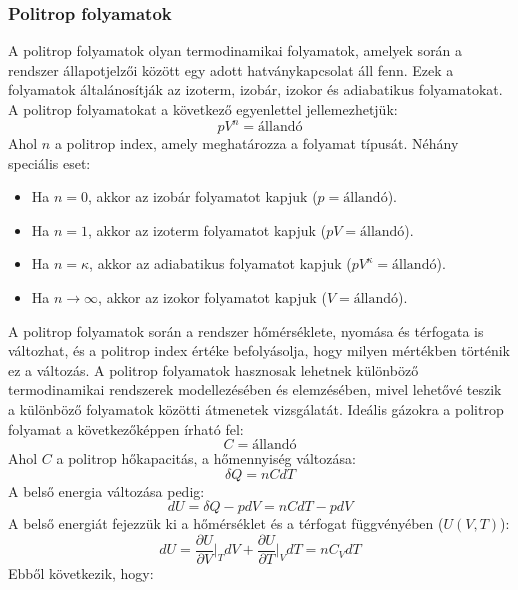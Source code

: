 \documentclass[../main.tex]{subfiles}
\begin{document}
\subsubsection{Politrop folyamatok}
A politrop folyamatok olyan termodinamikai folyamatok, amelyek során a rendszer állapotjelzői között egy adott hatványkapcsolat áll fenn. Ezek a folyamatok általánosítják az izoterm, izobár, izokor és adiabatikus folyamatokat.
A politrop folyamatokat a következő egyenlettel jellemezhetjük:
\begin{equation}
    p V^n = \text{állandó}
\end{equation}
Ahol $n$ a politrop index, amely meghatározza a folyamat típusát. Néhány speciális eset:
\begin{itemize}
    \item Ha $n = 0$, akkor az izobár folyamatot kapjuk ($p = \text{állandó}$).
    \item Ha $n = 1$, akkor az izoterm folyamatot kapjuk ($p V = \text{állandó}$).
    \item Ha $n = \kappa$, akkor az adiabatikus folyamatot kapjuk ($p V^{\kappa} = \text{állandó}$).
    \item Ha $n \to \infty$, akkor az izokor folyamatot kapjuk ($V = \text{állandó}$).
\end{itemize}
A politrop folyamatok során a rendszer hőmérséklete, nyomása és térfogata is változhat, és a politrop index értéke befolyásolja, hogy milyen mértékben történik ez a változás. A politrop folyamatok hasznosak lehetnek különböző termodinamikai rendszerek modellezésében és elemzésében, mivel lehetővé teszik a különböző folyamatok közötti átmenetek vizsgálatát.
Ideális gázokra a politrop folyamat a következőképpen írható fel:
\begin{equation}
    C = \text{állandó}
\end{equation}
Ahol $C$ a politrop hőkapacitás, a hőmennyiség változása:
\begin{equation}
    \delta Q = n C dT
\end{equation}
A belső energia változása pedig:
\begin{equation}
    dU = \delta Q - pdV = n C dT - p dV
\end{equation}
A belső energiát fejezzük ki a hőmérséklet és a térfogat függvényében ($U(V, T)$):
\begin{equation}
    dU = \frac{\partial U}{\partial V}\bigg|_{T} dV + \frac{\partial U}{\partial T}\bigg|_{V} dT = n C_V dT
\end{equation}
Ebből következik, hogy:
\end{document}
